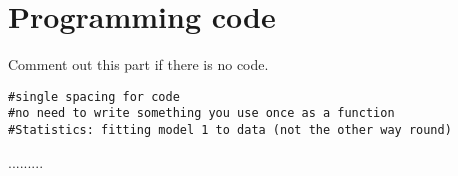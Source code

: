 \appendix


\chapter{Programming code}
Comment out this part if there is no code.
\begin{verbatim}
#single spacing for code
#no need to write something you use once as a function
#Statistics: fitting model 1 to data (not the other way round)

\end{verbatim}
.........




